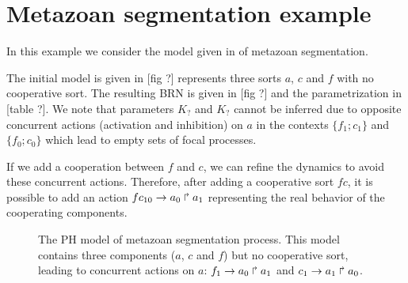 \appendix

\section{Metazoan segmentation example}

In this example we consider the model given in \cite{PMR10-TCSB} of metazoan segmentation.

The initial model is given in [fig ?] represents three sorts $a$, $c$ and $f$ with no cooperative sort. The resulting BRN is given in [fig ?] and the parametrization in [table ?].
We note that parameters $K_?$ and $K_?$ cannot be inferred due to opposite concurrent actions (activation and inhibition) on $a$ in the contexts $\{f_1 ; c_1\}$ and $\{f_0 ; c_0\}$ which lead to empty sets of focal processes.

If we add a cooperation between $f$ and $c$, we can refine the dynamics to avoid these concurrent actions. Therefore, after adding a cooperative sort $fc$, it is possible to add an action $fc_{10}\rightarrow a_0\Rsh a_1$ representing the real behavior of the cooperating components.

\begin{figure}[h]
\centering
{}

\caption{\label{fig:metazoan-nocoop}
The PH model of metazoan segmentation process. This model contains three components ($a$, $c$ and $f$) but no cooperative sort,
leading to concurrent actions on $a$: $f_1\rightarrow a_0\Rsh a_1$ and $c_1\rightarrow a_1\Rsh a_0$.
}
\end{figure}



